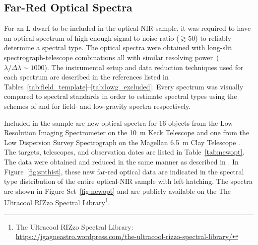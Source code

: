 \documentclass[12pt]{aastex6}
\begin{document}
\subsection{Far-Red Optical Spectra}
\label{sec:obs_new_opt}

For an L dwarf to be included in the optical-NIR sample, it was required to have an optical spectrum of high enough signal-to-noise ratio ($\gtrsim$50) to reliably determine a spectral type.
The optical spectra were obtained with long-slit spectrograph-telescope combinations all with similar resolving power~($\lambda/\Delta\lambda\sim1000$).
The instrumental setup and data reduction techniques used for each spectrum are described in the references listed in Tables~\ref{tab:field_template}--\ref{tab:lowg_excluded}.
Every spectrum was visually compared to spectral standards in order to estimate spectral types using the schemes of \citet{K99} and \cite{Cruz09_lowg} for field- and low-gravity spectra respectively.

Included in the sample are new optical spectra for 16 objects from the Low Resolution Imaging Spectrometer on the 10~m Keck Telescope \citep[LRIS]{LRIS} and one from the Low Dispersion Survey Spectrograph on the Magellan 6.5~m Clay Telescope \citep[LDSS-3]{LDSS2}.
The targets, telescopes, and observation dates are listed in Table~\ref{tab:newopt}.
The data were obtained and reduced in the same manner as described in \citet{Kirkpatrick10}.
In Figure~\ref{fig:spthist}, these new far-red optical data are indicated in the spectral type distribution of the entire optical-NIR sample with left hatching.
The spectra are shown in Figure Set~\ref{fig:newopt} and are publicly available on the The Ultracool RIZzo Spectral Library\footnote{The Ultracool RIZzo Spectral Library: \url{https://jgagneastro.wordpress.com/the-ultracool-rizzo-spectral-library/}}.

\figsetstart
{}

\figsetgrpstart
{}
\figsetgrpend

\figsetgrpstart
{}
\figsetgrpend
\end{document}
